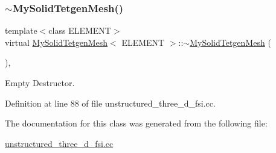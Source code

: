\mbox{\label{classMySolidTetgenMesh_ad0e9bf1679a2ba8d3d655b95d7124e91}} 
\subsubsection{\texorpdfstring{$\sim$\+My\+Solid\+Tetgen\+Mesh()}{~MySolidTetgenMesh()}}
{\footnotesize\ttfamily template$<$class E\+L\+E\+M\+E\+NT$>$ \\
virtual \hyperlink{classMySolidTetgenMesh}{My\+Solid\+Tetgen\+Mesh}$<$ E\+L\+E\+M\+E\+NT $>$\+::$\sim$\hyperlink{classMySolidTetgenMesh}{My\+Solid\+Tetgen\+Mesh} (\begin{DoxyParamCaption}{ }\end{DoxyParamCaption})\hspace{0.3cm}{\ttfamily [inline]}, {\ttfamily [virtual]}}



Empty Destructor. 



Definition at line 88 of file unstructured\+\_\+three\+\_\+d\+\_\+fsi.\+cc.



The documentation for this class was generated from the following file\+:\begin{DoxyCompactItemize}
\item 
\hyperlink{unstructured__three__d__fsi_8cc}{unstructured\+\_\+three\+\_\+d\+\_\+fsi.\+cc}\end{DoxyCompactItemize}
